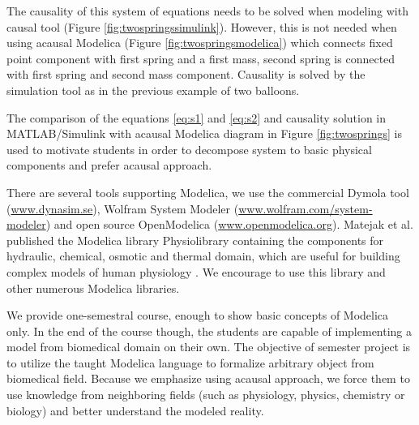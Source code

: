 \documentclass[letterpaper, 10 pt, conference]{ieeeconf}  %
\begin{document}
The causality of this system of equations needs to be solved when modeling with causal tool (Figure \ref{fig:twospringssimulink}). However, this is not needed when using acausal Modelica (Figure \ref{fig:twospringsmodelica}) which connects fixed point component with first spring and a first mass, second spring is connected with first spring and second mass component. Causality is solved by the simulation tool as in the previous example of two balloons. %

The comparison of the equations \ref{eq:s1} and \ref{eq:s2} and causality solution in MATLAB/Simulink with acausal Modelica diagram in Figure \ref{fig:twosprings} is used to motivate students in order to decompose system to basic physical components and prefer acausal approach. 


There are several tools supporting Modelica, we use the commercial Dymola tool (\url{www.dynasim.se}), Wolfram System Modeler (\url{www.wolfram.com/system-modeler}) and open source OpenModelica (\url{www.openmodelica.org}). Matejak et al. published the Modelica library Physiolibrary containing the components for hydraulic, chemical, osmotic and thermal domain, which are useful for building complex models of human physiology \cite{Matejak2014,Matejak2014mj}. We encourage to use this library and other numerous Modelica libraries. 

We provide one-semestral course, enough to show basic concepts of Modelica only. In the end of the course though, the students are capable of implementing a model from biomedical domain on their own. The objective of semester project is to utilize  the taught Modelica language to formalize arbitrary object from biomedical field. Because we emphasize using acausal approach, we force them to use knowledge from neighboring fields (such as physiology, physics, chemistry or biology) and better understand the modeled reality.
\end{document}
